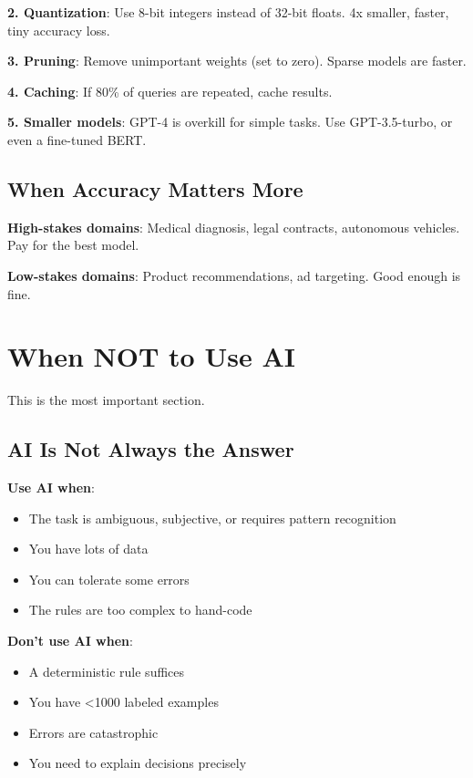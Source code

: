 \textbf{2. Quantization}: Use 8-bit integers instead of 32-bit floats. 4x smaller, faster, tiny accuracy loss.

\textbf{3. Pruning}: Remove unimportant weights (set to zero). Sparse models are faster.

\textbf{4. Caching}: If 80\% of queries are repeated, cache results.

\textbf{5. Smaller models}: GPT-4 is overkill for simple tasks. Use GPT-3.5-turbo, or even a fine-tuned BERT.

\subsection{When Accuracy Matters More}

\textbf{High-stakes domains}: Medical diagnosis, legal contracts, autonomous vehicles. Pay for the best model.

\textbf{Low-stakes domains}: Product recommendations, ad targeting. Good enough is fine.

\section{When NOT to Use AI}

This is the most important section.

\subsection{AI Is Not Always the Answer}

\textbf{Use AI when}:
\begin{itemize}
\item The task is ambiguous, subjective, or requires pattern recognition
\item You have lots of data
\item You can tolerate some errors
\item The rules are too complex to hand-code
\end{itemize}

\textbf{Don't use AI when}:
\begin{itemize}
\item A deterministic rule suffices
\item You have <1000 labeled examples
\item Errors are catastrophic
\item You need to explain decisions precisely
\end{itemize}

